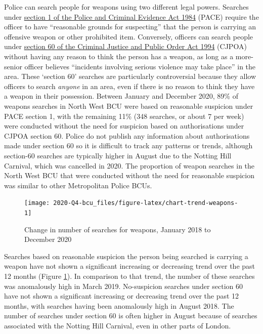 \documentclass[
  a4paper,
  twoside, 11pt]{article}
\begin{document}
Police can search people for weapons using two different legal powers. Searches under \href{https://www.legislation.gov.uk/ukpga/1984/60/section/1}{section 1 of the Police and Criminal Evidence Act 1984} (PACE) require the officer to have ``reasonable grounds for suspecting'' that the person is carrying an offensive weapon or other prohibited item. Conversely, officers can search people under \href{https://www.legislation.gov.uk/ukpga/1994/33/section/60}{section 60 of the Criminal Justice and Public Order Act 1994} (CJPOA) without having any reason to think the person has a weapon, as long as a more-senior officer believes ``incidents involving serious violence may take place'' in the area. These `section 60' searches are particularly controversial because they allow officers to search \emph{anyone} in an area, even if there is no reason to think they have a weapon in their possession. Between January and December 2020, 89\% of weapons searches in North West BCU were based on reasonable suspicion under PACE section 1, with the remaining 11\% (348 searches, or about 7 per week) were conducted without the need for suspicion based on authorisations under CJPOA section 60. Police do not publish any information about authorisations made under section 60 so it is difficult to track any patterns or trends, although section-60 searches are typically higher in August due to the Notting Hill Carnival, which was cancelled in 2020. The proportion of weapon searches in the North West BCU that were conducted without the need for reasonable suspicion was similar to other Metropolitan Police BCUs.



\begin{figure}[h]

{\centering \texttt{[image: 2020-Q4-bcu\_files/figure-latex/chart-trend-weapons-1]} 

}

\caption{Change in number of searches for weapons, January 2018 to December 2020}\label{fig:chart-trend-weapons}
\end{figure}

Searches based on reasonable suspicion the person being searched is carrying a weapon have not shown a significant increasing or decreasing trend over the past 12 months (Figure \ref{fig:chart-trend-weapons}). In comparison to that trend, the number of these searches was anomalously high in March 2019.
No-suspicion searches under section 60 have not shown a significant increasing or decreasing trend over the past 12 months, with searches having been anomalously high in August 2018. The number of searches under section 60 is often higher in August because of searches associated with the Notting Hill Carnival, even in other parts of London.
\end{document}
